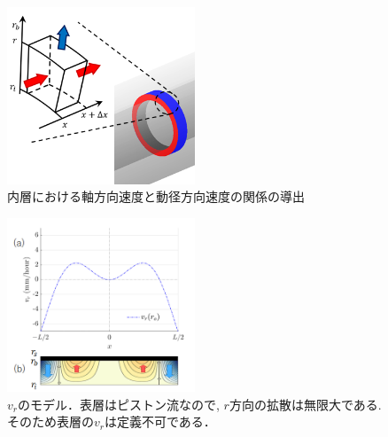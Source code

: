 \documentclass[prl,twocolumn,superscriptaddress]{revtex4}
\begin{document}
\begin{figure}[tb]
	\centering
	\includegraphics[width=0.5\textwidth]{figure/vx_vr_inner4.png}
	\caption{内層における軸方向速度と動径方向速度の関係の導出}
	\label{fig:vx_and_vr}
\end{figure}
\begin{figure}[tb]
	\centering
	\includegraphics[width=0.5\textwidth]{figure/model_vr.png}
	\caption{$v_r$のモデル．表層はピストン流なので, $r$方向の拡散は無限大である. そのため表層の$v_r$は定義不可である．}
	\label{fig:model_vr}
\end{figure}
\end{document}
